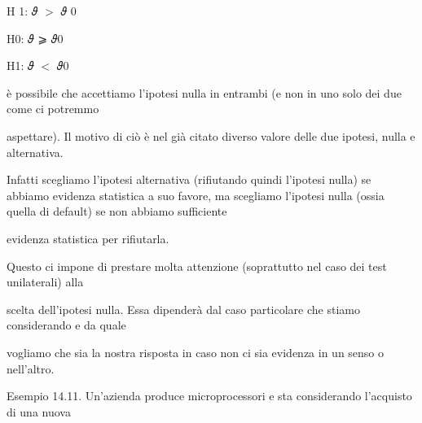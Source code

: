 \documentclass[a4paper,portrait,12pt]{article}
\begin{document}
\begin{flushleft}
H 1: 𝜗 $>$ 𝜗 0
\end{flushleft}





\begin{flushleft}
H0: 𝜗 ⩾ 𝜗0
\end{flushleft}


\begin{flushleft}
H1: 𝜗 $<$ 𝜗0
\end{flushleft}





\begin{flushleft}
\`{e} possibile che accettiamo l'ipotesi nulla in entrambi (e non in uno solo dei due come ci potremmo
\end{flushleft}


\begin{flushleft}
aspettare). Il motivo di ci\`{o} \`{e} nel gi\`{a} citato diverso valore delle due ipotesi, nulla e alternativa.
\end{flushleft}


\begin{flushleft}
Infatti scegliamo l'ipotesi alternativa (rifiutando quindi l'ipotesi nulla) se abbiamo evidenza statistica a suo favore, ma scegliamo l'ipotesi nulla (ossia quella di default) se non abbiamo sufficiente
\end{flushleft}


\begin{flushleft}
evidenza statistica per rifiutarla.
\end{flushleft}


\begin{flushleft}
Questo ci impone di prestare molta attenzione (soprattutto nel caso dei test unilaterali) alla
\end{flushleft}


\begin{flushleft}
scelta dell'ipotesi nulla. Essa dipender\`{a} dal caso particolare che stiamo considerando e da quale
\end{flushleft}


\begin{flushleft}
vogliamo che sia la nostra risposta in caso non ci sia evidenza in un senso o nell'altro.
\end{flushleft}


\begin{flushleft}
Esempio 14.11. Un'azienda produce microprocessori e sta considerando l'acquisto di una nuova
\end{flushleft}
\end{document}
